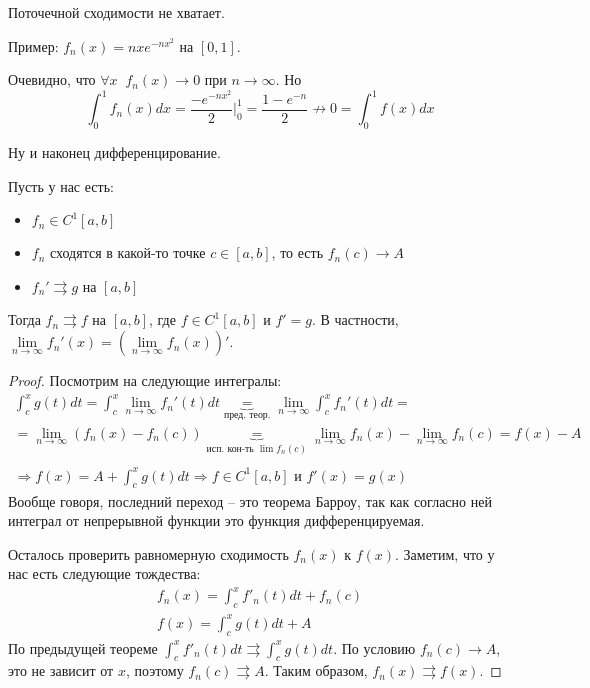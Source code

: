 \begin{notice}
    Поточечной сходимости не хватает.
    
    \quad Пример: $f_n(x) = nxe^{-nx^2}$ на $[0, 1]$.

    \quad Очевидно, что $\forall x \;\; f_n(x) \to 0$ при $n \to \infty$. Но \[ \int_0^1 f_n(x)dx = \frac{-e^{-nx^2}}{2}\Big|_0^1 = \frac{1 - e^{-n}}{2} \nrightarrow 0 = \int_0^1 f(x)dx \]
\end{notice}

\vspace*{10mm}

Ну и наконец дифференцирование.

\begin{theorem} Пусть у нас есть:
     \begin{itemize}
        \item $f_n \in C^1[a, b]$
        \item $f_n$ сходятся в какой-то точке $c \in [a, b]$, то есть $f_n(c) \to A$
        \item $f_n' \rightrightarrows g$ на $[a, b]$
    \end{itemize}
    Тогда $f_n \rightrightarrows f$ на $[a, b]$, где $f \in C^1[a, b]$ и $f' = g$. В частности, $\lim\limits_{n \to \infty} f_n'(x) = (\lim\limits_{n \to \infty} f_n(x))'$.
\end{theorem}
\begin{proof}
    Посмотрим на следующие интегралы:
    \begin{gather*}
        \int_c^x g(t)dt = \int_c^x \lim\limits_{n \to \infty} f_n'(t)dt \underbrace{=}_{\text{пред. теор.}} \lim\limits_{n \to \infty} \int_c^x  f_n'(t)dt = \\
        = \lim\limits_{n \to \infty} (f_n(x) - f_n(c)) \underbrace{=}_{\text{исп. кон-ть $\lim f_n(c)$}} \lim\limits_{n \to \infty} f_n(x) - \lim\limits_{n \to \infty} f_n(c) = f(x) - A \\ 
        \\
        \Rightarrow f(x) = A + \int_c^x g(t)dt \Rightarrow f \in C^1[a, b] \text{ и } f'(x) = g(x)
    \end{gather*}
    \quad Вообще говоря, последний переход -- это теорема Барроу, так как согласно ней интеграл от непрерывной функции это функция дифференцируемая.

    \quad Осталось проверить равномерную сходимость $f_n(x)$ к $f(x)$.
    Заметим, что у нас есть следующие тождества:
    \begin{gather*}
        f_n(x) = \int_c^x f'_n(t)dt + f_n(c) \\
        f(x) = \int_c^x g(t)dt + A
    \end{gather*}
    По предыдущей теореме $\int_c^x f'_n(t)dt \rightrightarrows \int_c^x g(t)dt$. 
    По условию $f_n(c) \to A$, это не зависит от $x$, поэтому $f_n(c) \rightrightarrows A$.
    Таким образом, $f_n(x) \rightrightarrows f(x)$.
\end{proof}


